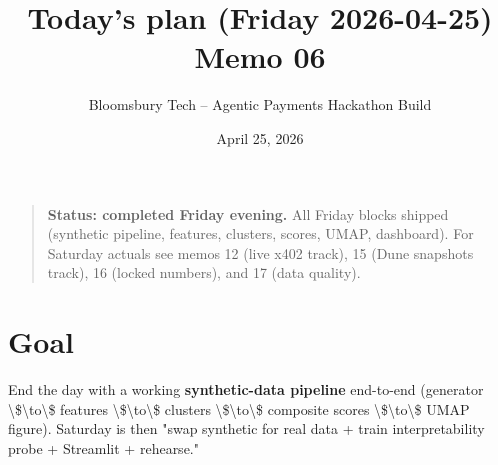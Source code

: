 \documentclass[11pt]{article}
\title{\textbf{Today's plan (Friday 2026-04-25)}\\
\large Memo 06}
\author{Bloomsbury Tech -- Agentic Payments Hackathon Build}
\date{April 25, 2026}
\begin{document}
\maketitle

\begin{quote}
\textbf{Status: completed Friday evening.} All Friday blocks shipped (synthetic pipeline, features, clusters, scores, UMAP, dashboard). For Saturday actuals see memos 12 (live x402 track), 15 (Dune snapshots track), 16 (locked numbers), and 17 (data quality).
\end{quote}
\section{Goal}
End the day with a working \textbf{synthetic-data pipeline} end-to-end (generator \textbackslash{}\$\textbackslash{}to\textbackslash{}\$ features \textbackslash{}\$\textbackslash{}to\textbackslash{}\$ clusters \textbackslash{}\$\textbackslash{}to\textbackslash{}\$ composite scores \textbackslash{}\$\textbackslash{}to\textbackslash{}\$ UMAP figure). Saturday is then "swap synthetic for real data + train interpretability probe + Streamlit + rehearse."
\end{document}
